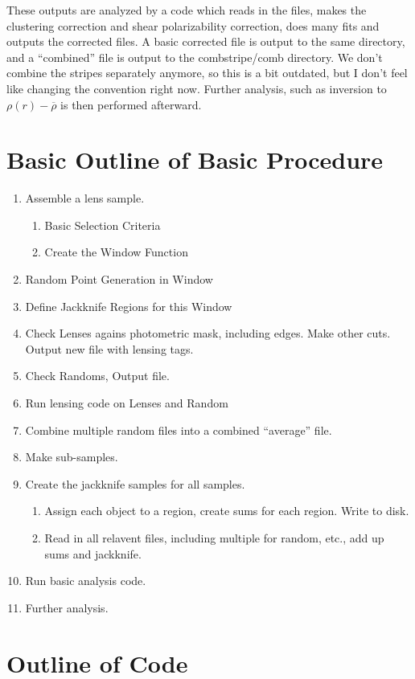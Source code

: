 \documentclass{emulateapj}
\begin{document}
These outputs are analyzed by a code which reads in the files, makes the
clustering correction and shear polarizability correction, does many fits and
outputs the corrected files.  A basic corrected file is output to the same
directory, and a ``combined'' file is output to the combstripe/comb directory.
We don't combine the stripes separately anymore, so this is a bit outdated, but
I don't feel like changing the convention right now. Further analysis, such as
inversion to $\rho(r)-\overline{\rho}$ is then performed afterward.


\section{Basic Outline of Basic Procedure}

\begin{enumerate}
  \item Assemble a lens sample.
    \begin{enumerate}
      \item Basic Selection Criteria
      \item Create the Window Function
    \end{enumerate}
  \item Random Point Generation in Window
  \item Define Jackknife Regions for this Window
  \item Check Lenses agains photometric mask, including edges. Make other cuts.
    Output new file with lensing tags.
  \item Check Randoms, Output file.
  \item Run lensing code on Lenses and Random
  \item Combine multiple random files into a combined ``average'' file.
  \item Make sub-samples.
  \item Create the jackknife samples for all samples.
    \begin{enumerate}
      \item Assign each object to a region, create sums for each region. Write
	to disk.
      \item Read in all relavent files, including multiple for random, etc.,
        add up sums and jackknife.
    \end{enumerate}
  \item Run basic analysis code.
  \item Further analysis.
\end{enumerate}

\section{Outline of Code}

\newpage





\newpage

\end{document}
